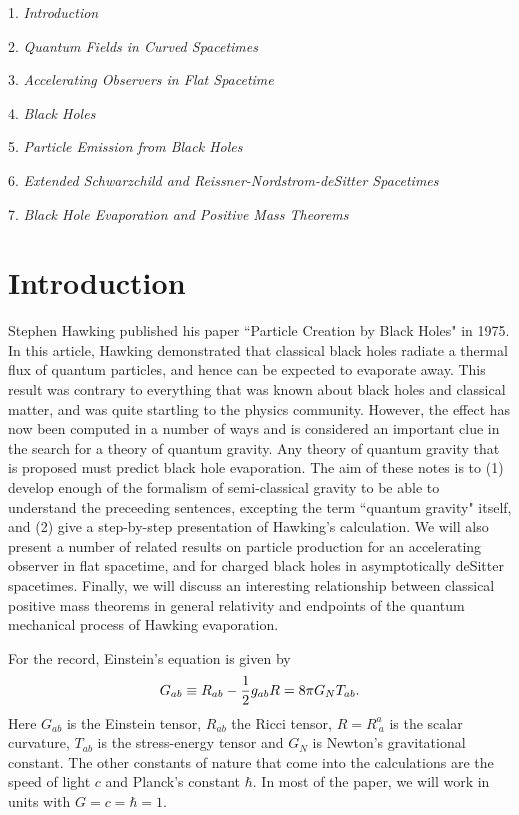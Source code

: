 \documentclass[12pt]{article}
\newcommand{\be}{\begin{equation}}
\newcommand{\ee}{\end{equation}}
\begin{document}
\setcounter{equation}{0}



\vskip 0.05in

1. {\it Introduction}

2. {\it Quantum Fields in Curved Spacetimes}

3. {\it Accelerating Observers in Flat Spacetime}

4. {\it Black Holes}

5. {\it Particle Emission from Black Holes}

6. {\it Extended Schwarzchild and Reissner-Nordstrom-deSitter Spacetimes}

7. {\it Black Hole Evaporation and Positive Mass Theorems}

\section{Introduction}

Stephen Hawking published his paper ``Particle Creation by Black Holes"
\cite{hawking} in 1975.  In this article, Hawking demonstrated that classical black
holes radiate a thermal flux of quantum particles, and hence can be
expected to evaporate away.
This result was contrary to everything that was known about black holes and
classical
matter, and was quite startling to the physics community. However, the
effect has now been
computed in a number of ways and is considered an important clue in the
search for a theory
of quantum gravity.  Any theory of quantum gravity that is proposed must
predict black hole
evaporation.  The aim of these notes is to (1) develop enough of the
formalism of
semi-classical gravity to be able to understand the preceeding sentences,
excepting the term
``quantum gravity" itself, and (2) give a  step-by-step presentation of
Hawking's
calculation. We will also present a number of  related results on particle
production for an
accelerating observer in flat spacetime, and  for charged black holes in
asymptotically
deSitter spacetimes. Finally, we will discuss an interesting relationship
between classical positive
mass theorems in general relativity and endpoints of the quantum mechanical
process of Hawking evaporation.

For the record, Einstein's equation is given by
%
\be\label{einstein}G_{ab}\equiv R_{ab} -{1\over 2} g_{ab} R = 8\pi G_N
T_{ab} .\ee
%
Here $G_{ab}$ is the Einstein tensor, $R_{ab}$ the Ricci tensor, $R= R^a
_{\ a}$ is the scalar
curvature, $T_{ab}$ is the stress-energy tensor and $G_N$ is Newton's
gravitational constant. The
other constants of nature that come into the calculations are the speed of
light $c$ and
Planck's constant $\hbar$. In most of the paper, we will work in units with
$G=c=\hbar
=1$.
\end{document}
